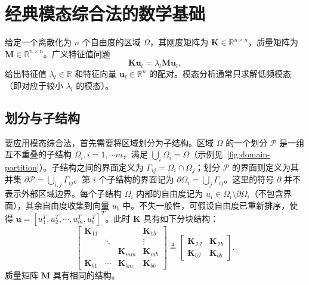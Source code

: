 \section{经典模态综合法的数学基础}

给定一个离散化为 $n$ 个自由度的区域 $\Omega$，其刚度矩阵为 $\mathbf{K} \in \mathbb{R}^{n\times n}$，质量矩阵为 $\mathbf{M} \in \mathbb{R}^{n \times n}$。广义特征值问题
\begin{equation} \mathbf{K} \mathbf{u}_l= \lambda_l \mathbf{M} \mathbf{u}_l,
  \label{eq:generalize-eigen-problem}
\end{equation}
给出特征值 $\lambda_l \in \mathbb{R}$ 和特征向量 $\mathbf{u}_l\in\mathbb{R}^{n}$ 的配对。模态分析通常只求解低频模态（即对应于较小 $\lambda_l$ 的模态）。

\subsection{划分与子结构}

要应用模态综合法，首先需要将区域划分为子结构。区域 $\Omega$ 的一个划分 $\mathcal{P}$ 是一组互不重叠的子结构 $\Omega_i, i=1, \cdots m$，满足 $\bigcup_i\Omega_i = \Omega$（示例见~\cref{fig:domain-partition}）。子结构之间的界面定义为 $\Gamma_{ij} = \Omega_i \cap \Omega_j$；划分 $\mathcal{P}$ 的界面则定义为其并集 $\partial \mathcal{P} = \bigcup_{i,j} \Gamma_{ij}$。第 $i$ 个子结构的界面记为 $\partial \Omega_i = \bigcup_{j} \Gamma_{ij}$。这里的符号 $\partial$ 并不表示外部区域边界。每个子结构 $\Omega_i$ 内部的自由度记为 $u_i \in \Omega_i\setminus\partial \Omega_i$（不包含界面），其余自由度收集到向量 $u_b$ 中。不失一般性，可假设自由度已重新排序，使得 $\mathbf{u} = [u_1^T, u_2^T, \cdots, u_m^T, u_b^T]^T$。此时 $\mathbf{K}$ 具有如下分块结构：
\begin{equation}
  \left[
    \begin{array}{ccc|c}
      \mathbf{K}_{11} & & & \mathbf{K}_{1b}\\
      &\ddots & & \vdots\\
      & & \mathbf{K}_{mm} & \mathbf{K}_{mb}\\\hline
      \mathbf{K}_{b1} &\cdots
    &\mathbf{K}_{bm} &\mathbf{K}_{bb}
    \end{array}
  \right]
  \triangleq
  \begin{bmatrix}
    \mathbf{K}_{\mathcal{I}\mathcal{I}}&\mathbf{K}_{\mathcal{I}b}\\
    \mathbf{K}_{b\mathcal{I}}&\mathbf{K}_{bb}
  \end{bmatrix}.
\end{equation}
质量矩阵 $\mathbf{M}$ 具有相同的结构。


